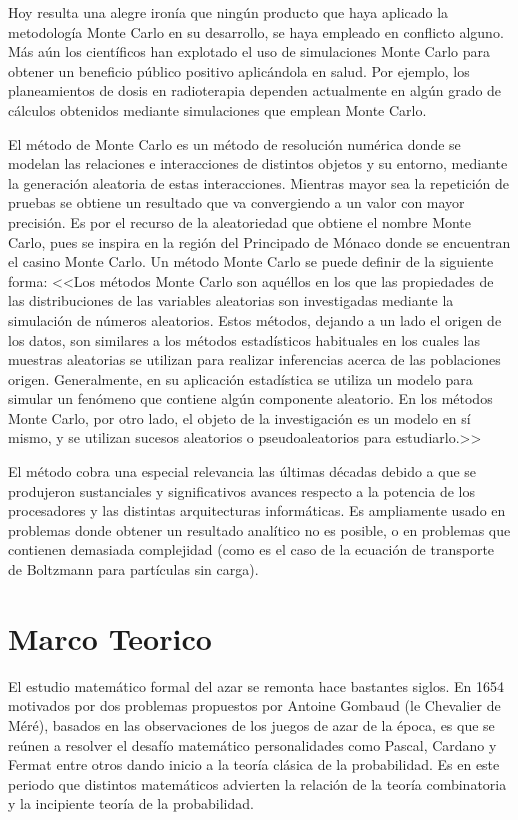 \documentclass{rbf}
\begin{document}
Hoy resulta una alegre ironía que ningún producto que haya aplicado la metodología Monte Carlo en su desarrollo, se haya empleado en conflicto alguno. Más aún los científicos han explotado el uso de simulaciones Monte Carlo para obtener un beneficio público positivo aplicándola en salud. Por ejemplo, los planeamientos de dosis en radioterapia dependen actualmente en algún grado de cálculos obtenidos mediante simulaciones que emplean Monte Carlo.


El método de Monte Carlo es un método de resolución numérica donde se modelan las relaciones e interacciones de distintos objetos y su entorno, mediante la generación aleatoria de estas interacciones. Mientras mayor sea la repetición de pruebas se obtiene un resultado que va convergiendo a un valor con mayor precisión. Es por el recurso de la aleatoriedad que obtiene el nombre Monte Carlo, pues se inspira en la región del Principado de Mónaco donde se encuentran el casino Monte Carlo.
Un método Monte Carlo se puede definir de la siguiente forma: <<Los métodos Monte Carlo son aquéllos en los que las propiedades de las distribuciones de las variables aleatorias son investigadas mediante la simulación de números aleatorios. Estos métodos, dejando a un lado el origen de los datos, son similares a los métodos estadísticos habituales en los cuales las muestras aleatorias se utilizan para realizar inferencias acerca de las poblaciones origen. Generalmente, en su aplicación estadística se utiliza un modelo para simular un fenómeno que contiene algún componente aleatorio. En los métodos Monte Carlo, por otro lado, el objeto de la investigación es un modelo en sí mismo, y se utilizan sucesos aleatorios o pseudoaleatorios para estudiarlo.>>\cite{Gentle}


El método cobra una especial relevancia las
últimas décadas debido a que se produjeron
sustanciales y significativos avances respecto a la
potencia de los procesadores y las distintas
arquitecturas informáticas. Es ampliamente usado
en problemas donde obtener un resultado
analítico no es posible, o en problemas que
contienen demasiada complejidad (como es el
caso de la ecuación de transporte de Boltzmann
para partículas sin carga).\cite{Kling}

\section{Marco Teorico}\label{inter}
El estudio matemático formal del azar se remonta hace bastantes siglos. En 1654 motivados por dos problemas propuestos por Antoine Gombaud (le Chevalier de Méré), basados en las observaciones de los juegos de azar de la época, es que se reúnen a resolver el desafío matemático personalidades como Pascal, Cardano y Fermat entre otros dando inicio a la teoría clásica de la probabilidad. Es en este periodo que distintos matemáticos advierten la relación de la teoría combinatoria y la incipiente teoría de la probabilidad.
\end{document}
